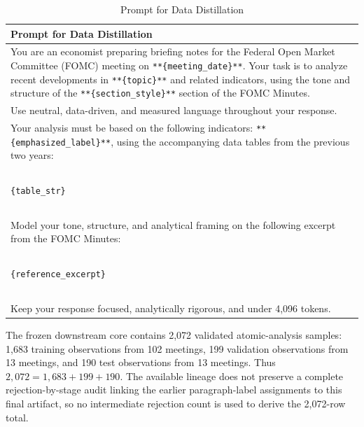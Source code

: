 \begin{table}[htbp]
    \centering
    \footnotesize
    \begin{tabular}{p{}}
    \toprule
    \textbf{Prompt for Data Distillation} \\
    \midrule
You are an economist preparing briefing notes for the Federal Open Market Committee (FOMC) meeting on \texttt{**\{meeting\_date\}**}.  
Your task is to analyze recent developments in \texttt{**\{topic\}**} and related indicators, using the tone and structure of the \texttt{**\{section\_style\}**} section of the FOMC Minutes. \\

Use neutral, data-driven, and measured language throughout your response. \\

Your analysis must be based on the following indicators: \texttt{**\{emphasized\_label\}**}, using the accompanying data tables from the previous two years: \\

~\\
\texttt{\{table\_str\}} \\
~\\


Model your tone, structure, and analytical framing on the following excerpt from the FOMC Minutes:\\

~\\
\texttt{\{reference\_excerpt\}} \\
~\\

Keep your response focused, analytically rigorous, and under 4,096 tokens. \\
    \bottomrule
    \end{tabular}
    \caption{Prompt for Data Distillation}
    \label{tab:ch2:prompt_for_data_distillation}
\end{table}


The frozen downstream core contains 2,072 validated atomic-analysis samples:
1,683 training observations from 102 meetings, 199 validation observations
from 13 meetings, and 190 test observations from 13 meetings. Thus
$2{,}072=1{,}683+199+190$. The available lineage does not preserve a complete
rejection-by-stage audit linking the earlier paragraph-label assignments to
this final artifact, so no intermediate rejection count is used to derive the
2,072-row total.




